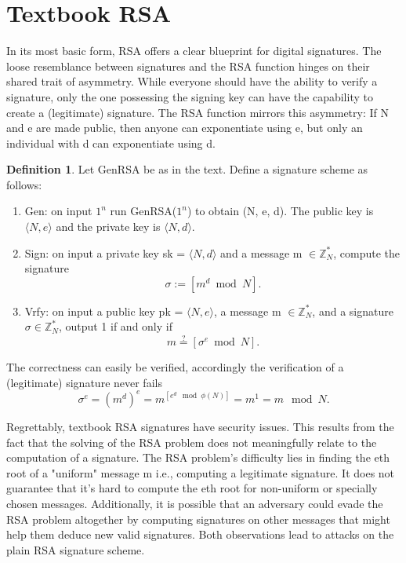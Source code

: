 \documentclass[]{final_report}
\theoremstyle{definition}
\newtheorem{definition}{Definition}[chapter]
\begin{document}
\section{Textbook RSA}
In its most basic form, RSA offers a clear blueprint for digital signatures. The loose resemblance between signatures and the RSA function hinges on their shared trait of asymmetry. While everyone should have the ability to verify a signature, only the one possessing the signing key can have the capability to create a (legitimate) signature. The RSA function mirrors this asymmetry: If N and e are made public, then anyone can exponentiate using e, but only an individual with d can exponentiate using d. \begin{definition}
\label{def:textbook rsa}
Let GenRSA be as in the text. Define a signature scheme as follows:
\begin{mdframed}
\begin{enumerate}
    \item Gen: on input $1^n$ run GenRSA($1^n$) to obtain (N, e, d). The public key is $\langle N, e \rangle$ and the private key is $\langle N, d \rangle$.

    \item Sign: on input a private key sk = $\langle N, d \rangle$ and a message m $\in \mathbb{Z}^*_{N}$, compute the signature
\[\sigma := [m^d \bmod N].\]
    \item Vrfy:  on input a public key pk = $\langle N, e \rangle$, a message m $\in \mathbb{Z}^*_{N}$, and a signature $\sigma \in \mathbb{Z}^*_{N}$, output 1 if and only if
    \[m \stackrel{?}{=} [\sigma^e \bmod N].\]
\end{enumerate}
\end{mdframed}
\end{definition}
The correctness can easily be verified, accordingly the verification of a (legitimate) signature never fails
\[\sigma^e = (m^d)^e = m^{[e^{d}\mod \phi(N)]} = m^1 = m\mod N.\]

Regrettably, textbook RSA signatures have security issues. This results from the fact that the solving of the RSA problem does not meaningfully relate to the computation of a signature. The RSA problem's difficulty lies in finding the eth root of a "uniform" message m i.e., computing a legitimate signature. It does not guarantee that it's hard to compute the eth root for non-uniform or specially chosen messages. Additionally, it is possible that an adversary could evade the RSA problem altogether by computing signatures on other messages that might help them deduce new valid signatures. Both observations lead to attacks on the plain RSA signature scheme. 
\end{document}
